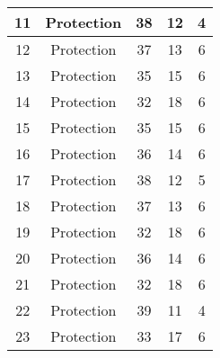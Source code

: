 \documentclass[results.tex]{subfiles}
\begin{document}
\begin{center}
\begin{tabular}{| c || c | c | c | c |}
            \hline
            11                      & Protection                   & 38                     & 12                      & 4                    \\
            \hline
            12                      & Protection                   & 37                     & 13                      & 6                    \\
            \hline
            13                      & Protection                   & 35                     & 15                      & 6                    \\
            \hline
            14                      & Protection                   & 32                     & 18                      & 6                    \\
            \hline
            15                      & Protection                   & 35                     & 15                      & 6                    \\
            \hline
            16                      & Protection                   & 36                     & 14                      & 6                    \\
            \hline
            17                      & Protection                   & 38                     & 12                      & 5                    \\
            \hline
            18                      & Protection                   & 37                     & 13                      & 6                    \\
            \hline
            19                      & Protection                   & 32                     & 18                      & 6                    \\
            \hline
            20                      & Protection                   & 36                     & 14                      & 6                    \\
            \hline
            21                      & Protection                   & 32                     & 18                      & 6                    \\
            \hline
            22                      & Protection                   & 39                     & 11                      & 4                    \\
            \hline
            23                      & Protection                   & 33                     & 17                      & 6                    \\

\end{tabular}
\end{center}
\end{document}
